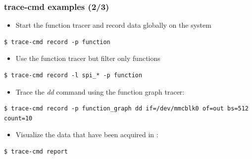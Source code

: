 \begin{frame}[fragile]
  \frametitle{trace-cmd examples (2/3)}
  \begin{itemize}
    \item Start the function tracer and record data globally on the system
  \end{itemize}
  \begin{block}{}
    \begin{verbatim}
$ trace-cmd record -p function
    \end{verbatim}
  \end{block}

  \begin{itemize}
    \item Use the function tracer but filter only  functions
  \end{itemize}
  \begin{block}{}
    \begin{verbatim}
$ trace-cmd record -l spi_* -p function
    \end{verbatim}
  \end{block}

  \begin{itemize}
    \item Trace the {\em dd} command using the function graph tracer:
  \end{itemize}
  \begin{block}{}
    \begin{verbatim}
$ trace-cmd record -p function_graph dd if=/dev/mmcblk0 of=out bs=512 count=10
    \end{verbatim}
  \end{block}

  \begin{itemize}
    \item Visualize the data that have been acquired in :
  \end{itemize}
  \begin{block}{}
    \begin{verbatim}
$ trace-cmd report
    \end{verbatim}
  \end{block}
\end{frame}

